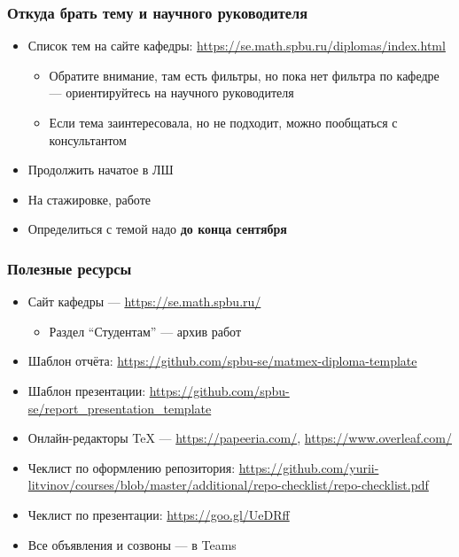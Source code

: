 \documentclass{../../slides-style}
\begin{document}
    \begin{frame}
        \frametitle{Откуда брать тему и научного руководителя}
        \begin{itemize}
            \item Список тем на сайте кафедры: \url{https://se.math.spbu.ru/diplomas/index.html}
            \begin{itemize}
                \item Обратите внимание, там есть фильтры, но пока нет фильтра по кафедре --- ориентируйтесь на научного руководителя
                \item Если тема заинтересовала, но не подходит, можно пообщаться с консультантом
            \end{itemize}
            \item Продолжить начатое в ЛШ
            \item На стажировке, работе
            \item Определиться с темой надо \textbf{до конца сентября}
        \end{itemize}
    \end{frame}

    \begin{frame}
        \frametitle{Полезные ресурсы}
        \begin{itemize}
            \item Сайт кафедры --- \url{https://se.math.spbu.ru/}
            \begin{itemize}
                \item Раздел \enquote{Студентам} --- архив работ
            \end{itemize}
            \item Шаблон отчёта: \url{https://github.com/spbu-se/matmex-diploma-template}
            \item Шаблон презентации: \url{https://github.com/spbu-se/report_presentation_template}
            \item Онлайн-редакторы TeX --- \url{https://papeeria.com/}, \url{https://www.overleaf.com/}
            \item Чеклист по оформлению репозитория: \url{https://github.com/yurii-litvinov/courses/blob/master/additional/repo-checklist/repo-checklist.pdf}
            \item Чеклист по презентации: \url{https://goo.gl/UeDRff}
            \item Все объявления и созвоны --- в Teams
        \end{itemize}
    \end{frame}
\end{document}
